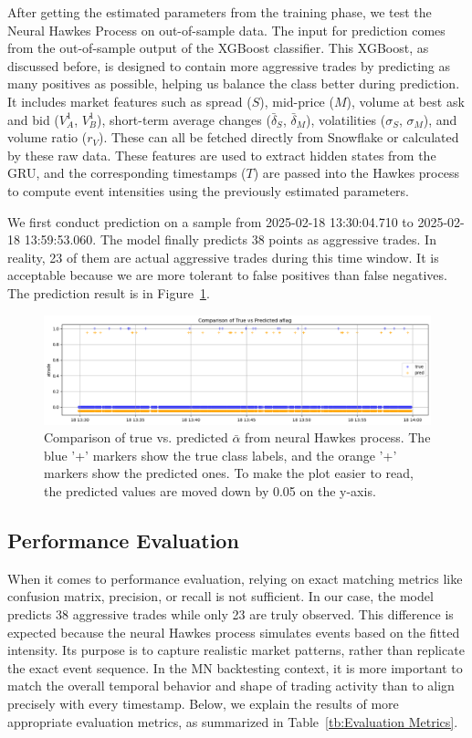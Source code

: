 After getting the estimated parameters from the training phase, we test the Neural Hawkes Process on out-of-sample data. The input for prediction comes from the out-of-sample output of the XGBoost classifier. This XGBoost, as discussed before, is designed to contain more aggressive trades by predicting as many positives as possible, helping us balance the class better during prediction. It includes market features such as spread ($S$), mid-price ($M$), volume at best ask and bid ($V_A^1$, $V_B^1$), short-term average changes ($\bar{\delta}_S$, $\bar{\delta}_M$), volatilities ($\sigma_S$, $\sigma_M$), and volume ratio ($r_V$). These can all be fetched directly from Snowflake or calculated by these raw data. These features are used to extract hidden states from the GRU, and the corresponding timestamps ($T$) are passed into the Hawkes process to compute event intensities using the previously estimated parameters.

We first conduct prediction on a sample from 2025-02-18 13:30:04.710 to 2025-02-18 13:59:53.060. The model finally predicts 38 points as aggressive trades. In reality, 23 of them are actual aggressive trades during this time window. It is acceptable because we are more tolerant to false positives than false negatives. The prediction result is in Figure~\ref{fig:nhp-aflag}.

\begin{figure}[H]
    \centering
    \includegraphics[width=0.9\linewidth]{figures/aflag_NHP_181330.png}
    \caption{Comparison of true vs. predicted $\bar{\alpha}$ from neural Hawkes process. 
    The blue '+' markers show the true class labels, and the orange '+' markers show the predicted ones. To make the plot easier to read, the predicted values are moved down by 0.05 on the y-axis.
    }
    \label{fig:nhp-aflag}
\end{figure}



\subsection{Performance Evaluation}
When it comes to performance evaluation, relying on exact matching metrics like confusion matrix, precision, or recall is not sufficient. In our case, the model predicts 38 aggressive trades while only 23 are truly observed. This difference is expected because the neural Hawkes process simulates events based on the fitted intensity. Its purpose is to capture realistic market patterns, rather than replicate the exact event sequence. In the MN backtesting context, it is more important to match the overall temporal behavior and shape of trading activity than to align precisely with every timestamp. Below, we explain the results of more appropriate evaluation metrics, as summarized in Table~\ref{tb:Evaluation Metrics}.

